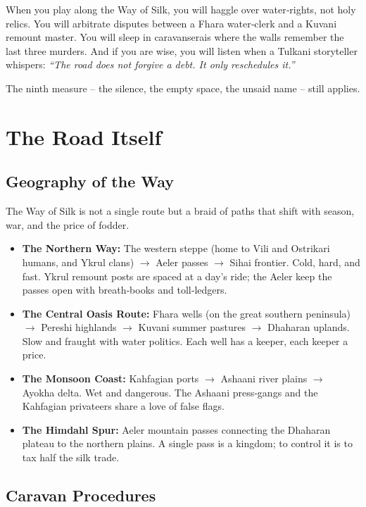 \documentclass[11pt]{book}
\begin{document}
When you play along the Way of Silk, you will haggle over water‑rights, not holy relics. You will arbitrate disputes between a Fhara water‑clerk and a Kuvani remount master. You will sleep in caravanserais where the walls remember the last three murders. And if you are wise, you will listen when a Tulkani storyteller whispers: \textit{“The road does not forgive a debt. It only reschedules it.”}

The ninth measure -- the silence, the empty space, the unsaid name -- still applies.

\clearpage
\chapter{The Road Itself}

\section{Geography of the Way}

The Way of Silk is not a single route but a braid of paths that shift with season, war, and the price of fodder.

\begin{itemize}
    \item \textbf{The Northern Way:} The western steppe (home to Vili and Ostrikari humans, and Ykrul clans) \(\to\) Aeler passes \(\to\) Sihai frontier. Cold, hard, and fast. Ykrul remount posts are spaced at a day’s ride; the Aeler keep the passes open with breath‑books and toll‑ledgers.
    \item \textbf{The Central Oasis Route:} Fhara wells (on the great southern peninsula) \(\to\) Pereshi highlands \(\to\) Kuvani summer pastures \(\to\) Dhaharan uplands. Slow and fraught with water politics. Each well has a keeper, each keeper a price.
    \item \textbf{The Monsoon Coast:} Kahfagian ports \(\to\) Ashaani river plains \(\to\) Ayokha delta. Wet and dangerous. The Ashaani press‑gangs and the Kahfagian privateers share a love of false flags.
    \item \textbf{The Himdahl Spur:} Aeler mountain passes connecting the Dhaharan plateau to the northern plains. A single pass is a kingdom; to control it is to tax half the silk trade.
\end{itemize}

\section{Caravan Procedures}
\end{document}
